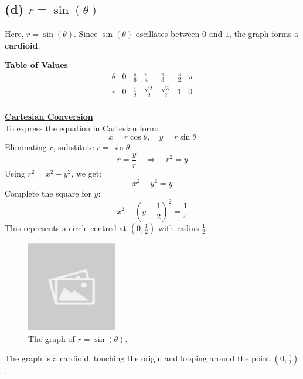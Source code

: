 \documentclass{article}
\begin{document}
\subsection*{(d) \( r = \sin(\theta) \)}
\begin{solutionbox}
Here, \( r = \sin(\theta) \). Since \( \sin(\theta) \) oscillates between \( 0 \) and \( 1 \), the graph forms a \textbf{cardioid}.

\textbf{\underline{Table of Values}}
\[
\begin{array}{c|c|c|c|c|c|c}
\theta & 0 & \frac{\pi}{6} & \frac{\pi}{4} & \frac{\pi}{3} & \frac{\pi}{2} & \pi \\
\hline
r & 0 & \frac{1}{2} & \frac{\sqrt{2}}{2} & \frac{\sqrt{3}}{2} & 1 & 0 \\
\end{array}
\]

\textbf{\underline{Cartesian Conversion}} \\
To express the equation in Cartesian form:
\[
x = r \cos\theta, \quad y = r \sin\theta
\]
Eliminating \( r \), substitute \( r = \sin\theta \):
\[
r = \frac{y}{r} \quad \Rightarrow \quad r^2 = y
\]
Using \( r^2 = x^2 + y^2 \), we get:
\[
x^2 + y^2 = y
\]
Complete the square for \( y \):
\[
x^2 + \left(y - \frac{1}{2}\right)^2 = \frac{1}{4}
\]
This represents a circle centred at \( \left(0, \frac{1}{2}\right) \) with radius \( \frac{1}{2} \).

\begin{figure}[H]
    \centering
    \includegraphics[width=0.35\textwidth]{sample_image.jpg}
    \caption{The graph of \( r = \sin(\theta) \).}
    \label{fig:cardioid_graph}
\end{figure}
The graph is a cardioid, touching the origin and looping around the point \( \left(0, \frac{1}{2}\right) \).
\end{solutionbox}
\end{document}
